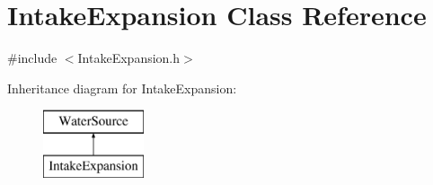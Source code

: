 \hypertarget{classIntakeExpansion}{}\section{Intake\+Expansion Class Reference}
\label{classIntakeExpansion}


{\ttfamily \#include $<$Intake\+Expansion.\+h$>$}

Inheritance diagram for Intake\+Expansion\+:\begin{figure}[H]
\begin{center}
\leavevmode
\includegraphics[height=2.000000cm]{classIntakeExpansion}
\end{center}
\end{figure}
